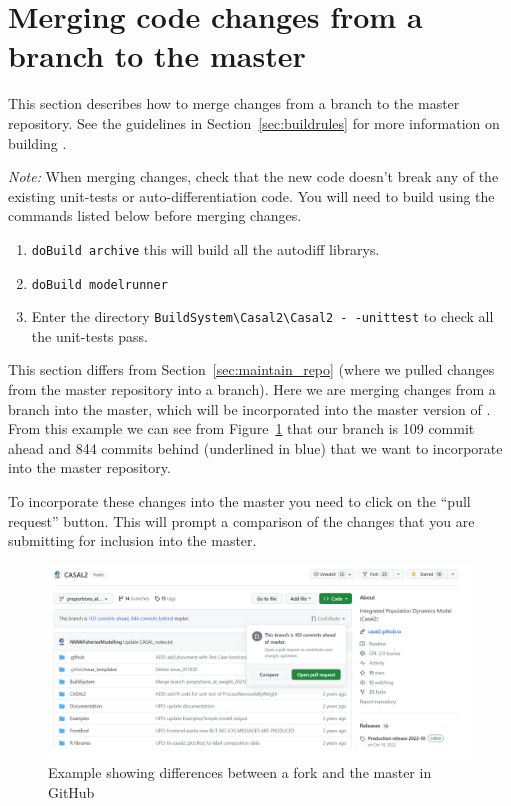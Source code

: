 \section{Merging code changes from a branch to the master\label{sec:pull_requests}}

This section describes how to merge changes from a branch to the master repository. See the guidelines in Section~\ref{sec:buildrules} for more information on building \CNAME. 

\emph{Note:} When merging changes, check that the new code doesn't break any of the existing unit-tests or auto-differentiation code. You will need to build using the commands listed below before merging changes.

\begin{enumerate}
	\item \texttt{doBuild archive} this will build all the autodiff librarys.
	\item \texttt{doBuild modelrunner}
	\item Enter the directory  \texttt{BuildSystem\textbackslash Casal2\textbackslash Casal2 - -unittest} to check all the unit-tests pass.
\end{enumerate}

This section differs from Section~\ref{sec:maintain_repo} (where we pulled changes from the master repository into a branch). Here we are merging changes from a branch into the master, which will be incorporated into the master version of \CNAME. From this example we can see from Figure~\ref{fig:fork_merge1} that our branch is 109 commit ahead and 844 commits behind (underlined in blue) that we want to incorporate into the master repository.

To incorporate these changes into the master you need to click on the \enquote{pull request} button. This will prompt a comparison of the changes that you are submitting for inclusion into the master.

\begin{figure}[H]
	\centering
	\includegraphics[scale=0.4]{Figures/create_pull_request.png}
	\caption{Example showing differences between a fork and the master in GitHub}\label{fig:fork_merge1}
\end{figure}

